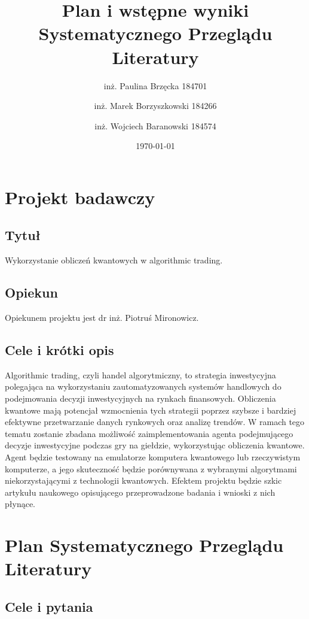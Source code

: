 \documentclass[polish,envcountsect,10pt]{article}
\title{Plan i wstępne wyniki Systematycznego Przeglądu Literatury}
\author{inż. Paulina Brzęcka 184701 \and inż. Marek Borzyszkowski 184266 \and inż. Wojciech Baranowski 184574}
\date{\today}
\begin{document}
\maketitle
\tableofcontents
\newpage

\section{Projekt badawczy}

\subsection{Tytuł}

Wykorzystanie obliczeń kwantowych w algorithmic trading.

\subsection{Opiekun}

Opiekunem projektu jest dr inż. Piotruś Mironowicz.

\subsection{Cele i krótki opis}

Algorithmic trading, czyli handel algorytmiczny, to strategia inwestycyjna polegająca na wykorzystaniu zautomatyzowanych systemów handlowych do podejmowania decyzji inwestycyjnych na rynkach finansowych. Obliczenia kwantowe mają potencjał wzmocnienia tych strategii poprzez szybsze i bardziej efektywne przetwarzanie danych rynkowych oraz analizę trendów. W ramach tego tematu zostanie zbadana możliwość zaimplementowania agenta podejmującego decyzje inwestycyjne podczas gry na giełdzie, wykorzystując obliczenia kwantowe. Agent będzie testowany na emulatorze komputera kwantowego lub rzeczywistym komputerze, a jego skuteczność będzie porównywana z wybranymi algorytmami niekorzystającymi z technologii kwantowych. Efektem projektu będzie szkic artykułu naukowego opisującego przeprowadzone badania i wnioski z nich płynące.

\section{Plan Systematycznego Przeglądu Literatury}

\subsection{Cele i pytania}
\end{document}
